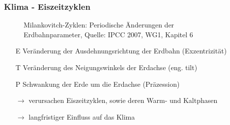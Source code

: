 \begin{frame}
\frametitle{Klima - Eiszeitzyklen}
\begin{figure}
	\centering
	\caption{Milankovitch-Zyklen: Periodische Änderungen der Erdbahnparameter, Quelle: IPCC 2007, WG1, Kapitel 6}
\end{figure}
\begin{itemize}
	\item[E] Veränderung der Ausdehnungsrichtung der Erdbahn (Exzentrizität)%
	\item[T] Veränderung des Neigungswinkels der Erdachse (eng. tilt)
	\item[P] Schwankung der Erde um die Erdachse (Präzession) %
	\item[$\rightarrow$] verursachen Eiszeitzyklen, sowie deren Warm- und Kaltphasen
	\item[$\rightarrow$] langfristiger Einfluss auf das Klima
\end{itemize}


\end{frame}
